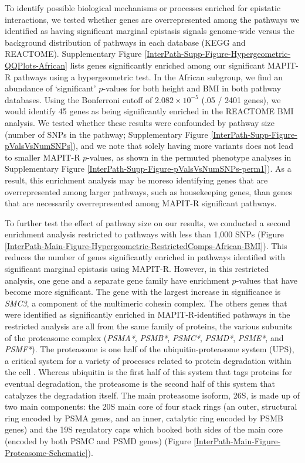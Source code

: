 \documentclass[12pt,a4paper]{article}
\begin{document}
To identify possible biological mechanisms or processes enriched for epistatic interactions, we tested whether genes are overrepresented among the pathways we identified as having significant marginal epistasis signals genome-wide versus the background distribution of pathways in each database (KEGG and REACTOME). Supplementary Figure \ref{InterPath-Supp-Figure-Hypergeometric-QQPlots-African} lists genes significantly enriched among our significant MAPIT-R pathways using a hypergeometric test. 
In the African subgroup, we find an abundance of `significant' $p$-values for both height and BMI in both pathway databases. Using the Bonferroni cutoff of $2.082\times10^{-5}$ (.05 / 2401 genes), we would identify 45 genes as being significantly enriched in the REACTOME BMI analysis. We tested whether these results were confounded by pathway size (number of SNPs in the pathway; Supplementary Figure \ref{InterPath-Supp-Figure-pValsVsNumSNPs}), and we note that solely having more variants does not lead to smaller MAPIT-R $p$-values, as shown in the permuted phenotype analyses in Supplementary Figure \ref{InterPath-Supp-Figure-pValsVsNumSNPs-perm1}). As a result, this enrichment analysis may be moreso identifying genes that are overrepresented among larger pathways, such as housekeeping genes, than genes that are necessarily overrepresented among MAPIT-R significant pathways. 

To further test the effect of pathway size on our results, we conducted a second enrichment analysis restricted to pathways with less than 1,000 SNPs (Figure \ref{InterPath-Main-Figure-Hypergeometric-RestrictedComps-African-BMI}). This reduces the number of genes significantly enriched in pathways identified with significant marginal epistasis using MAPIT-R. However, in this restricted analysis, one gene and a separate gene family have enrichment $p$-values that have become more significant. The gene with the largest increase in significance is {\emph{SMC3}}, a component of the multimeric cohesin complex. The others genes that were identified as significantly enriched in MAPIT-R-identified pathways in the restricted analysis are all from the same family of proteins, the various subunits of the proteasome complex ({\emph{PSMA*}}, {\emph{PSMB*}}, {\emph{PSMC*}}, {\emph{PSMD*}}, {\emph{PSME*}}, and {\emph{PSMF*}}). The proteasome is one half of the ubiquitin-proteasome system (UPS), a critical system for a variety of processes related to protein degradation within the cell \citep{Voges1999,Livneh2016,Collins2017}. Whereas ubiquitin is the first half of this system that tags proteins for eventual degradation, the proteasome is the second half of this system that catalyzes the degradation itself. The main proteasome isoform, 26S, is made up of two main components: the 20S main core of four stack rings (an outer, structural ring encoded by PSMA genes, and an inner, catalytic ring encoded by PSMB genes) and the 19S regulatory caps which booked both sides of the main core (encoded by both PSMC and PSMD genes) (Figure \ref{InterPath-Main-Figure-Proteasome-Schematic}). 
\end{document}
